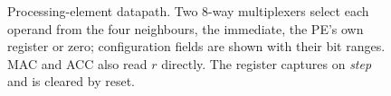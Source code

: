 \begin{figure}[t]
  \centering
  \resizebox{\columnwidth}{!}{}
  \caption{Processing-element datapath. Two 8-way multiplexers select each
  operand from the four neighbours, the immediate, the PE's own register or
  zero; configuration fields are shown with their bit ranges. MAC and ACC
  also read $r$ directly. The register captures on \emph{step} and is
  cleared by reset.}
  \label{fig:pe}
\end{figure}
